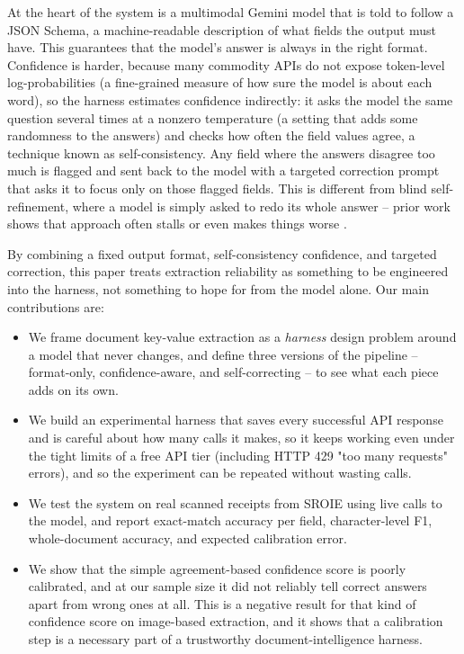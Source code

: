 \documentclass[conference]{IEEEtran}
\begin{document}
At the heart of the system is a multimodal Gemini model that is told to follow a JSON Schema, a machine-readable description of what fields the output must have. This guarantees that the model's answer is always in the right format. Confidence is harder, because many commodity APIs do not expose token-level log-probabilities (a fine-grained measure of how sure the model is about each word), so the harness estimates confidence indirectly: it asks the model the same question several times at a nonzero temperature (a setting that adds some randomness to the answers) and checks how often the field values agree, a technique known as self-consistency. Any field where the answers disagree too much is flagged and sent back to the model with a targeted correction prompt that asks it to focus only on those flagged fields. This is different from blind self-refinement, where a model is simply asked to redo its whole answer -- prior work shows that approach often stalls or even makes things worse \cite{b3}.

By combining a fixed output format, self-consistency confidence, and targeted correction, this paper treats extraction reliability as something to be engineered into the harness, not something to hope for from the model alone. Our main contributions are:

\begin{itemize}
    \item We frame document key-value extraction as a \emph{harness} design problem around a model that never changes, and define three versions of the pipeline -- format-only, confidence-aware, and self-correcting -- to see what each piece adds on its own.
    \item We build an experimental harness that saves every successful API response and is careful about how many calls it makes, so it keeps working even under the tight limits of a free API tier (including HTTP 429 "too many requests" errors), and so the experiment can be repeated without wasting calls.
    \item We test the system on real scanned receipts from SROIE using live calls to the model, and report exact-match accuracy per field, character-level F1, whole-document accuracy, and expected calibration error.
    \item We show that the simple agreement-based confidence score is poorly calibrated, and at our sample size it did not reliably tell correct answers apart from wrong ones at all. This is a negative result for that kind of confidence score on image-based extraction, and it shows that a calibration step is a necessary part of a trustworthy document-intelligence harness.
\end{itemize}
\end{document}
